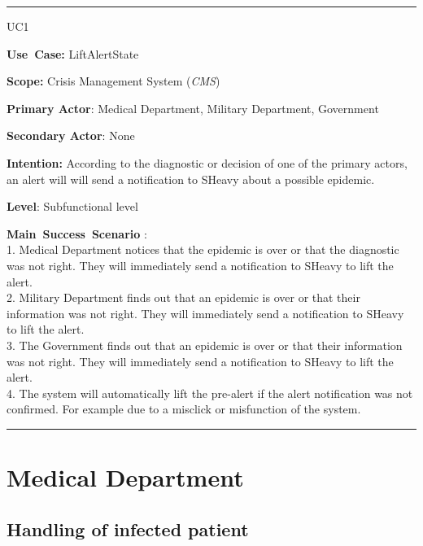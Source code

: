 \vspace{0.5cm}
\hrule
\vspace{0.5cm}
\begin{lyxlist}{UC1}
\small{
\item [\textbf{Use~Case:}] LiftAlertState
\item [\textbf{Scope:}] Crisis Management System (\emph{CMS})
\item [\textbf{Primary Actor}:] Medical Department, Military Department,
Government
\item [\textbf{Secondary Actor}:] None
\item [\textbf{Intention:}] According to the diagnostic or decision of one of
the primary actors, an alert will will send a notification to SHeavy about a
possible epidemic.
\item [\textbf{Level}:]Subfunctional level
\item [\textbf{Main~Success~Scenario}]:\\
1. Medical Department notices that the epidemic is over or that the
diagnostic was not right. They will immediately send a notification to SHeavy
to lift the alert.\\
2. Military Department finds out that an epidemic is over or that their
information was not right. They will immediately send a notification to SHeavy
to lift the alert.\\
3. The Government finds out that an epidemic is over or that their
information was not right. They will immediately send a notification to SHeavy
to lift the alert.\\
4. The system will automatically lift the pre-alert if the alert notification
was not confirmed. For example due to a misclick or misfunction of the system.\\
}
\end{lyxlist}
\hrule
\vspace{0.5cm} 

\section{Medical Department}

\subsection{Handling of infected patient}

